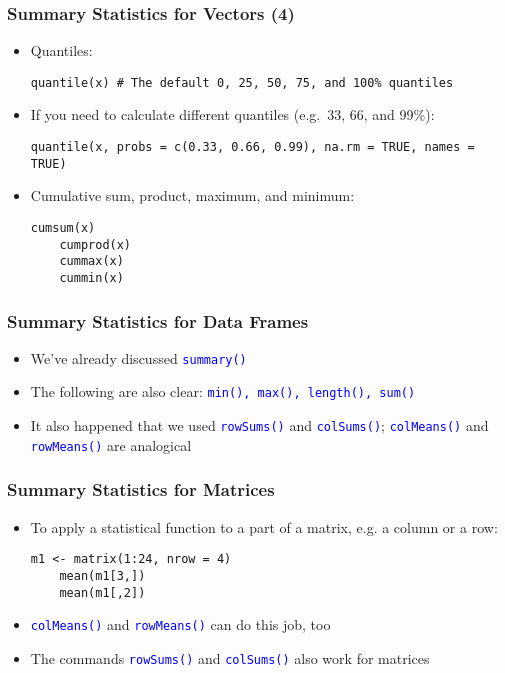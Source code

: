 \documentclass[10pt]{beamer}
\newcommand{\cc}[1]{\texttt{\textcolor{blue}{#1}}}
\theoremstyle{definition}
\begin{document}
\begin{frame}[fragile]
\frametitle{Summary Statistics for Vectors (4)}
\begin{itemize}
	\item Quantiles:
	\begin{lstlisting}[style = rstyle, breaklines]
	quantile(x) # The default 0, 25, 50, 75, and 100% quantiles
	\end{lstlisting}
	
	\item If you need to calculate different quantiles (e.g.~33, 66, and 99\%):
	\begin{lstlisting}[style = rstyle, breaklines]
	quantile(x, probs = c(0.33, 0.66, 0.99), na.rm = TRUE, names = TRUE)
	\end{lstlisting}

	\item Cumulative sum, product, maximum, and minimum:
	\begin{lstlisting}[style = rstyle, breaklines]
	cumsum(x)
	cumprod(x)
	cummax(x)
	cummin(x)
	\end{lstlisting}
\end{itemize}
\end{frame}

\begin{frame}[fragile]
\frametitle{Summary Statistics for Data Frames}
\begin{itemize}
	\item We've already discussed \cc{summary()}
	
	\item The following are also clear: \cc{min(),\ max(),\ length(),\ sum()}
	
	\item It also happened that we used \cc{rowSums()} and \cc{colSums()}; \cc{colMeans()} and \cc{rowMeans()} are analogical
\end{itemize}
\end{frame}

\begin{frame}[fragile]
\frametitle{Summary Statistics for Matrices}
\begin{itemize}
	\item To apply a statistical function to a part of a matrix, e.g. a column or a row:
	\begin{lstlisting}[style = rstyle, breaklines]
	m1 <- matrix(1:24, nrow = 4)
	mean(m1[3,])
	mean(m1[,2])
	\end{lstlisting}

	\item \cc{colMeans()} and \cc{rowMeans()} can do this job, too
	
	\item The commands \cc{rowSums()} and \cc{colSums()} also work for matrices
\end{itemize}
\end{frame}
\end{document}
